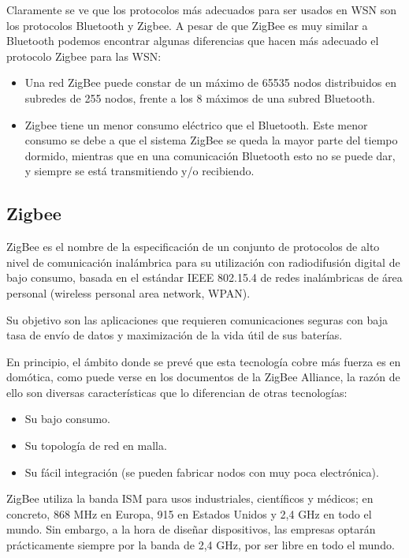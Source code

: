  

Claramente se ve que los protocolos m\'as adecuados para ser usados en WSN son los protocolos Bluetooth y Zigbee. A pesar de que ZigBee es muy similar a Bluetooth podemos encontrar algunas diferencias que hacen m\'as adecuado el protocolo Zigbee para las WSN: 

\begin{itemize}
\item Una red ZigBee puede constar de un m\'aximo de 65535 nodos distribuidos en subredes de 255 nodos, frente a los 8 m\'aximos de una subred Bluetooth. 
\item Zigbee tiene un menor consumo el\'ectrico que el Bluetooth. Este menor consumo se debe a que el sistema ZigBee se queda la mayor parte del tiempo dormido, mientras que en una comunicaci\'on Bluetooth esto no se puede dar, y siempre se est\'a transmitiendo y/o recibiendo.
\end{itemize}



\subsection{Zigbee}
ZigBee es el nombre de la especificaci\'on de un conjunto de protocolos de alto nivel de comunicaci\'on inal\'ambrica para su utilizaci\'on con radiodifusi\'on digital de bajo consumo, basada en el est\'andar IEEE 802.15.4 de redes inal\'ambricas de \'area personal (wireless personal area network, WPAN).

Su objetivo son las aplicaciones que requieren comunicaciones seguras con baja tasa de env\'io de datos y maximizaci\'on de la vida \'util de sus bater\'ias.

En principio, el \'ambito donde se prev\'e que esta tecnolog\'ia cobre m\'as fuerza es en dom\'otica, como puede verse en los documentos de la ZigBee Alliance, la raz\'on de ello son diversas caracter\'isticas que lo diferencian de otras tecnolog\'ias:

\begin{itemize}
\item Su bajo consumo.
\item Su topolog\'ia de red en malla.
\item Su f\'acil integraci\'on (se pueden fabricar nodos con muy poca electr\'onica).
\end{itemize}
ZigBee utiliza la banda ISM para usos industriales, cient\'ificos y m\'edicos; en concreto, 868 MHz en Europa, 915 en Estados Unidos y 2,4 GHz en todo el mundo. Sin embargo, a la hora de dise\~nar dispositivos, las empresas optar\'an pr\'acticamente siempre por la banda de 2,4 GHz, por ser libre en todo el mundo.

